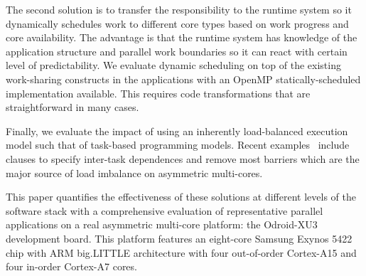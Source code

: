 The second solution is to transfer the responsibility to the runtime system so it 
dynamically schedules work to different core types based on work progress and core 
availability. The advantage is that the runtime system has knowledge of the application 
structure and parallel work boundaries so it can react with certain level of predictability. 
We evaluate dynamic scheduling on top of the existing work-sharing constructs in the applications 
with an OpenMP statically-scheduled implementation available. This requires code transformations 
that are straightforward in many cases.

Finally, we evaluate the impact of using an inherently load-balanced execution model such 
that of task-based programming models. 
Recent examples~\cite{Ayguade:TPDS2009, OpenMP4.0:Manual2013, OmpSs_PPL11, Zuckerman:EXADAPT2011, Bauer.2012.SC, Vandierendonck:PACT2011, Vandierendonck:Hyperq} 
include clauses to specify inter-task dependences and remove most barriers which are the major 
source of load imbalance on asymmetric multi-cores.


This paper quantifies the effectiveness of these solutions at different levels of the software stack
with a comprehensive evaluation of representative parallel applications on a real 
asymmetric multi-core platform: the Odroid-XU3 development board. This platform features an 
eight-core Samsung Exynos 5422 chip with ARM big.LITTLE architecture with 
four out-of-order Cortex-A15 and four in-order Cortex-A7 cores.

